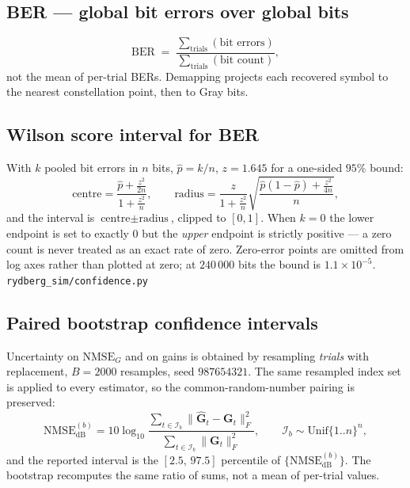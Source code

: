 \documentclass[11pt,a4paper]{article}
\newcommand{\src}[1]{{\footnotesize\color{srcgray}\texttt{#1}}}
\newcommand{\mat}[1]{\mathbf{#1}}
\newcommand{\NMSE}{\mathrm{NMSE}}
\newcommand{\BER}{\mathrm{BER}}
\newcommand{\dB}{\mathrm{dB}}
\begin{document}
\subsection{BER --- global bit errors over global bits}
\begin{equation}
\BER \;=\;
\frac{\sum_{\text{trials}}(\text{bit errors})}
     {\sum_{\text{trials}}(\text{bit count})} ,
\label{eq:ber}
\end{equation}
not the mean of per-trial BERs. Demapping projects each recovered symbol to
the nearest constellation point, then to Gray bits.

\subsection{Wilson score interval for BER}
With $k$ pooled bit errors in $n$ bits, $\hat p=k/n$, $z=1.645$ for a
one-sided $95\%$ bound:
\begin{equation}
\text{centre}=\frac{\hat p+\frac{z^2}{2n}}{1+\frac{z^2}{n}},
\qquad
\text{radius}=\frac{z}{1+\frac{z^2}{n}}
  \sqrt{\frac{\hat p(1-\hat p)+\frac{z^2}{4n}}{n}} ,
\label{eq:wilson}
\end{equation}
and the interval is $\text{centre}\pm\text{radius}$, clipped to $[0,1]$. When
$k=0$ the lower endpoint is set to exactly $0$ but the \emph{upper} endpoint
is strictly positive --- a zero count is never treated as an exact rate of
zero. Zero-error points are omitted from log axes rather than plotted at zero;
at $240\,000$ bits the bound is $1.1\times10^{-5}$.
\src{rydberg\_sim/confidence.py}

\subsection{Paired bootstrap confidence intervals}
Uncertainty on $\NMSE_G$ and on gains is obtained by resampling \emph{trials}
with replacement, $B=2000$ resamples, seed $987654321$. The same resampled
index set is applied to every estimator, so the common-random-number pairing
is preserved:
\begin{equation}
\NMSE^{(b)}_{\dB}
= 10\log_{10}
\frac{\sum_{t\in\mathcal{I}_b}\|\hat{\mat{G}}_t-\mat{G}_t\|_F^2}
     {\sum_{t\in\mathcal{I}_b}\|\mat{G}_t\|_F^2},
\qquad
\mathcal{I}_b\sim\text{Unif}\{1..n\}^{n} ,
\label{eq:boot}
\end{equation}
and the reported interval is the $[2.5,\,97.5]$ percentile of
$\{\NMSE^{(b)}_{\dB}\}$. The bootstrap recomputes the same ratio of sums, not
a mean of per-trial values.
\end{document}
